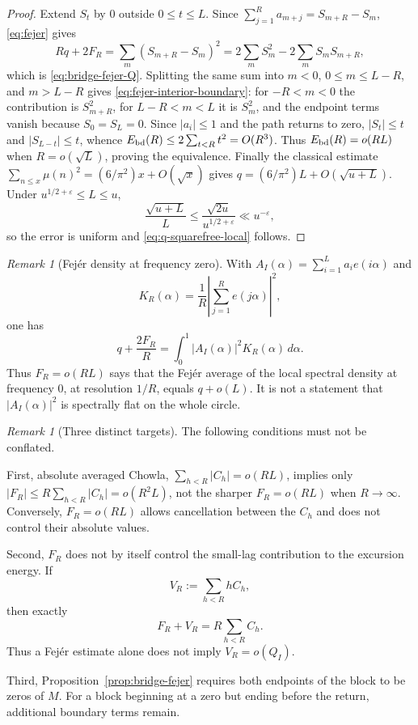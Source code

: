 \documentclass[11pt]{amsart}
\numberwithin{equation}{section}
\theoremstyle{plain}
\theoremstyle{definition}
\theoremstyle{remark}
\newtheorem{remark}[theorem]{Remark}
\newcommand{\eps}{\varepsilon}
\begin{document}
\begin{proof}
Extend $S_t$ by $0$ outside $0\le t\le L$. Since
$\sum_{j=1}^Ra_{m+j}=S_{m+R}-S_m$, \eqref{eq:fejer} gives
\[
Rq+2F_R=\sum_m(S_{m+R}-S_m)^2
=2\sum_mS_m^2-2\sum_mS_mS_{m+R},
\]
which is \eqref{eq:bridge-fejer-Q}. Splitting the same sum into $m<0$, $0\le m\le L-R$, and $m>L-R$
gives \eqref{eq:fejer-interior-boundary}: for $-R<m<0$ the contribution is
$S_{m+R}^2$, for $L-R<m<L$ it is $S_m^2$, and the endpoint terms vanish
because $S_0=S_L=0$.  Since $|a_i|\le1$ and the path returns
to zero, $|S_t|\le t$ and $|S_{L-t}|\le t$, whence
$E_{\rm bd}(R)\le2\sum_{t<R}t^2=O(R^3)$. Thus
$E_{\rm bd}(R)=o(RL)$ when $R=o(\sqrt L)$, proving the equivalence.
Finally the classical estimate
$\sum_{n\le x}\mu(n)^2=(6/\pi^2)x+O(\sqrt x)$ gives
$q=(6/\pi^2)L+O(\sqrt{u+L})$.  Under
$u^{1/2+\eps}\le L\le u$,
\[
 \frac{\sqrt{u+L}}{L}\le
 \frac{\sqrt{2u}}{u^{1/2+\eps}}\ll u^{-\eps},
\]
so the error is uniform and \eqref{eq:q-squarefree-local} follows.
\end{proof}

\begin{remark}[Fej\'er density at frequency zero]
\label{rem:fejer-spectrum}
With $A_I(\alpha)=\sum_{i=1}^La_ie(i\alpha)$ and
\[
K_R(\alpha)=\frac1R\left|\sum_{j=1}^Re(j\alpha)\right|^2,
\]
one has
\[
q+\frac{2F_R}{R}=\int_0^1|A_I(\alpha)|^2K_R(\alpha)\,d\alpha.
\]
Thus $F_R=o(RL)$ says that the Fej\'er average of the local spectral density
at frequency $0$, at resolution $1/R$, equals $q+o(L)$. It is not a
statement that $|A_I(\alpha)|^2$ is spectrally flat on the whole circle.
\end{remark}

\begin{remark}[Three distinct targets]
\label{rem:three-chowla-targets}
The following conditions must not be conflated.

First, absolute averaged Chowla,
$\sum_{h<R}|C_h|=o(RL)$, implies only
$|F_R|\le R\sum_{h<R}|C_h|=o(R^2L)$, not the sharper
$F_R=o(RL)$ when $R\to\infty$. Conversely, $F_R=o(RL)$ allows cancellation
between the $C_h$ and does not control their absolute values.

Second, $F_R$ does not by itself control the small-lag contribution to the
excursion energy. If
\[
V_R:=\sum_{h<R}hC_h,
\]
then exactly
\begin{equation}
\label{eq:F-V-relation}
F_R+V_R=R\sum_{h<R}C_h.
\end{equation}
Thus a Fej\'er estimate alone does not imply $V_R=o(Q_I)$.

Third, Proposition~\ref{prop:bridge-fejer} requires both endpoints of the
block to be zeros of $M$. For a block beginning at a zero but ending before
the return, additional boundary terms remain.
\end{remark}
\end{document}
